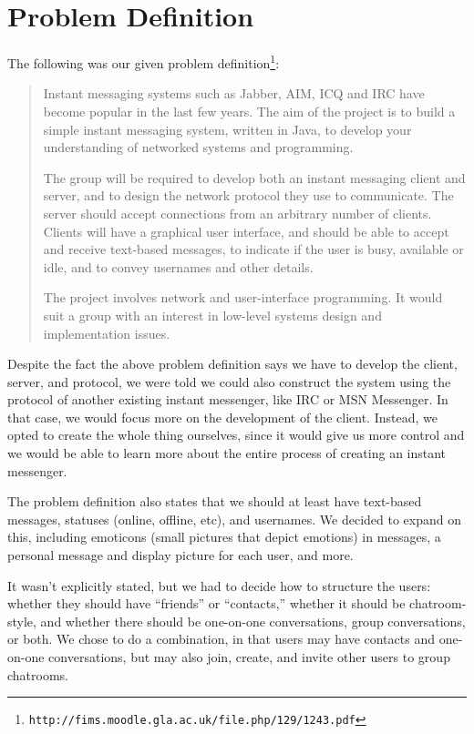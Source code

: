 \section{Problem Definition}
The following was our given problem definition\footnote{\texttt{http://fims.moodle.gla.ac.uk/file.php/129/1243.pdf}}:

\begin{quote}
Instant messaging systems such as Jabber, AIM, ICQ and IRC have become popular in the last few years. The aim of the project is to build a simple instant messaging system, written in Java, to develop your understanding of networked systems and programming.

The group will be required to develop both an instant messaging client and server, and to design the network protocol they use to communicate. The server should accept connections from an arbitrary number of clients. Clients will have a graphical user interface, and should be able to accept and receive text-based messages, to indicate if the user is busy, available or idle, and to convey usernames and other details.

The project involves network and user-interface programming. It would suit a group with an interest in low-level systems design and implementation issues.
\end{quote}

Despite the fact the above problem definition says we have to develop the client, server, and protocol, we were told we could also construct the system using the protocol of another existing instant messenger, like IRC or MSN Messenger. In that case, we would focus more on the development of the client. Instead, we opted to create the whole thing ourselves, since it would give us more control and we would be able to learn more about the entire process of creating an instant messenger.

The problem definition also states that we should at least have text-based messages, statuses (online, offline, etc), and usernames. We decided to expand on this, including emoticons (small pictures that depict emotions) in messages, a personal message and display picture for each user, and more.

It wasn't explicitly stated, but we had to decide how to structure the users: whether they should have ``friends'' or ``contacts,'' whether it should be chatroom-style, and whether there should be one-on-one conversations, group conversations, or both. We chose to do a combination, in that users may have contacts and one-on-one conversations, but may also join, create, and invite other users to group chatrooms. %

